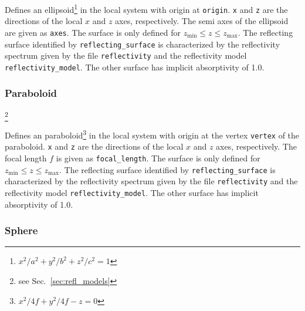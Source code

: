 \documentclass[10pt,a4paper,titlepage]{article}
\begin{document}
\vspace{0.25cm}
Defines an ellipsoid\footnote{${x^2}/{a^2}+{y^2}/{b^2}+{z^2}/{c^2}=1$} in the local system with origin at {\tt origin}. {\tt x} and {\tt z} are the directions of the local $x$ and $z$ axes, respectively. The semi axes of the ellipsoid are given as {\tt axes}. The surface is only defined for $z_\mathrm{min} \leq z \leq z_\mathrm{max}$. The reflecting surface identified by {\tt reflecting\_surface} is characterized by the reflectivity spectrum given by the file {\tt reflectivity} and the reflectivity model {\tt reflectivity\_model}. The other surface has implicit absorptivity of 1.0.

\subsubsection{Paraboloid}










\footnote{see Sec.~\ref{sec:refl_models}}


\vspace{0.25cm}
Defines an paraboloid\footnote{${x^2}/{4f}+{y^2}/{4f}-z=0$} in the local system with origin at the vertex {\tt vertex} of the paraboloid. {\tt x} and {\tt z} are the directions of the local $x$ and $z$ axes, respectively. The focal length $f$ is given as {\tt focal\_length}. The surface is only defined for $z_\mathrm{min} \leq z \leq z_\mathrm{max}$. The reflecting surface identified by {\tt reflecting\_surface} is characterized by the reflectivity spectrum given by the file {\tt reflectivity} and the reflectivity model {\tt reflectivity\_model}. The other surface has implicit absorptivity of 1.0.

\subsubsection{Sphere}
\end{document}
